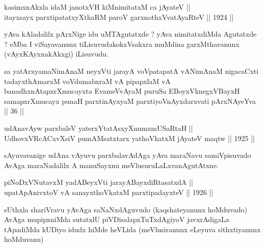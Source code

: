 \begin{shl}
kasimxnAkxla idaM janotxVH kiMnimitatxM ca jAyateV ||  \\
itayxsayx parxtipatatxyXthaRM paroV garxnothxV\s vatAyaRteV \hfill || 1924 ||
  
\end{shl}

\begin{artha}
yAva kAladalilx pArxNige idu uMTAgutatxde ? yAva nimitatxdiMda
Agutatxde ? eMba I viSayavanunx tiLisuvudakokxVsakxra muMdina
garxMthavanunx (vAyxKAyxnakAkxgi) iLisuvudu.
\end{artha}


\begin{shl}
sa yatArxyamaNimAnaM neyxVti jarayA voVpatapatA vANimAnaM nigacaCxti tadayxthAmarxM voVdumabxraM vA pipapxlaM vA banadhxnAtapxrXmucayxta EvameVvAyaM puruSa EBoyxV\s knegxVBayxH samapxrXmucayx punaH parxtinAyxyaM parxtiyoVnAyxdarxvati pArxNAyeYva || 36 ||
\end{shl}


\begin{shl}
udAnavAyw parxbaleV yaterxYtatAsxyXnumxmUSaRtaH ||  \\
UdhovxVRcACxvXsiV pumAMsatxtarx yathoVkatxM jAyateV maqtw \hfill || 1925 ||
  
\end{shl}

\begin{artha}
sAyuvavanige udAna vAyuvu parxbalavAdAga yAva maraNavu samiVpisuvado
AvAga maraNadalilx A manuSayxnu meVlusuruLaLxvanAgutAtxne.
\end{artha}


\begin{shl}
piNoDxV\s NutavxM yadA\s BeyxVti jarayA\s BayxdiRtasatxdA || \\
upatApAnivxtoV vA sanayxthoVkatxM parxtipadayxteV \hfill || 1926 ||
  
\end{shl}

\begin{artha}
sUthxla shariVravu yAvAga saNaNxdAguvudo (kaqshateyanunx hoMduvado)
AvAga mupipxniMda sutatxlU piVDisalapxTuTxdAgiyoV javxrAdigaLa
tApadiMda kUDiyo idudx hiMde heVLida (meVlusiranunx eLeyuva
sithxtiyanunx hoMduvanu)
\end{artha}

